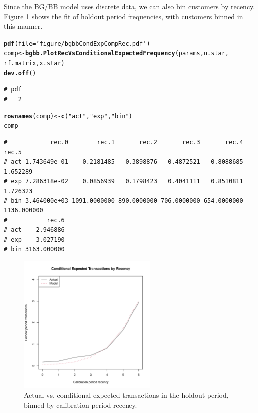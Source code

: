 \documentclass[10pt, letterpaper, onecolumn, oneside, final]{article}\usepackage[]{graphicx}\usepackage[]{color}
\makeatletter
\newcommand{\hlstr}[1]{\textcolor[rgb]{0.192,0.494,0.8}{#1}}%
\newcommand{\hlstd}[1]{\textcolor[rgb]{0.345,0.345,0.345}{#1}}%
\newcommand{\hlkwb}[1]{\textcolor[rgb]{0.69,0.353,0.396}{#1}}%
\newcommand{\hlkwc}[1]{\textcolor[rgb]{0.333,0.667,0.333}{#1}}%
\newcommand{\hlkwd}[1]{\textcolor[rgb]{0.737,0.353,0.396}{\textbf{#1}}}%
\newenvironment{kframe}{%
 \def\at@end@of@kframe{}%
 \ifinner\ifhmode%
  \def\at@end@of@kframe{\end{minipage}}%
  \begin{minipage}{\columnwidth}%
 \fi\fi%
 \def\FrameCommand##1{\hskip\@totalleftmargin \hskip-\fboxsep
 \colorbox{shadecolor}{##1}\hskip-\fboxsep
     \hskip-\linewidth \hskip-\@totalleftmargin \hskip\columnwidth}%
 \MakeFramed {\advance\hsize-\width
   \@totalleftmargin\z@ \linewidth\hsize
   \@setminipage}}%
 {\par\unskip\endMakeFramed%
 \at@end@of@kframe}
\newenvironment{knitrout}{}{} %
\makeatother
\begin{document}
Since the BG/BB model uses discrete data, we can also bin customers by
recency. Figure \ref{fig:bgbbCondExpCompRec} shows the fit of holdout
period frequencies, with customers binned in this manner.

\begin{knitrout}\small
{}\color{fgcolor}\begin{kframe}
\begin{alltt}
\hlkwd{pdf}\hlstd{(}\hlkwc{file} \hlstd{=} \hlstr{'figure/bgbbCondExpCompRec.pdf'}\hlstd{)}
\hlstd{comp} \hlkwb{<-} \hlkwd{bgbb.PlotRecVsConditionalExpectedFrequency}\hlstd{(params, n.star,}
                                                   \hlstd{rf.matrix, x.star)}
\hlkwd{dev.off}\hlstd{()}
\end{alltt}
\begin{verbatim}
# pdf 
#   2
\end{verbatim}
\begin{alltt}
\hlkwd{rownames}\hlstd{(comp)} \hlkwb{<-} \hlkwd{c}\hlstd{(}\hlstr{"act"}\hlstd{,} \hlstr{"exp"}\hlstd{,} \hlstr{"bin"}\hlstd{)}
\hlstd{comp}
\end{alltt}
\begin{verbatim}
#            rec.0        rec.1       rec.2       rec.3       rec.4       rec.5
# act 1.743649e-01    0.2181485   0.3898876   0.4872521   0.8088685    1.652289
# exp 7.286318e-02    0.0856939   0.1798423   0.4041111   0.8510811    1.726323
# bin 3.464000e+03 1091.0000000 890.0000000 706.0000000 654.0000000 1136.000000
#           rec.6
# act    2.946886
# exp    3.027190
# bin 3163.000000
\end{verbatim}
\end{kframe}
\end{knitrout}

\begin{figure}
  \begin{center}
  \includegraphics[width=0.6\textwidth]{figure/bgbbCondExpCompRec}
  \caption{Actual vs. conditional expected transactions in the holdout period, binned by calibration period recency.}\label{fig:bgbbCondExpCompRec}
  \end{center}
\end{figure}
\end{document}
